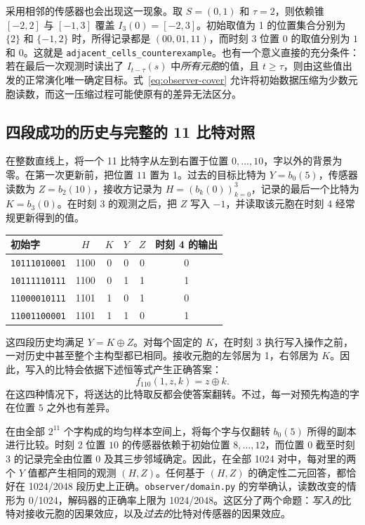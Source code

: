 采用相邻的传感器也会出现这一现象。取 $S=(0,1)$ 和 $\tau=2$，则依赖锥 $[-2,2]$ 与 $[-1,3]$ 覆盖 $I_3(0)=[-2,3]$。初始取值为 1 的位置集合分别为 $\{2\}$ 和 $\{-1,2\}$ 时，所得记录都是 $(00,01,11)$，而时刻 $3$ 位置 $0$ 的取值分别为 $1$ 和 $0$。这就是 \texttt{adjacent\_cells\_counterexample}。也有一个意义直接的充分条件：若在最后一次观测时读出了 $I_{t-\tau}(s)$ 中\emph{所有元胞}的值，且 $t\ge\tau$，则由这些值出发的正常演化唯一确定目标。式~\eqref{eq:observer-cover} 允许将初始数据压缩为少数元胞读数，而这一压缩过程可能使原有的差异无法区分。

\subsection{四段成功的历史与完整的 11 比特对照}

在整数直线上，将一个 11 比特字从左到右置于位置 $0,\ldots,10$，字以外的背景为零。在第一次更新前，把位置 $11$ 置为 1。过去的目标比特为 $Y=b_0(5)$，传感器读数为 $Z=b_2(10)$，接收方记录为 $H=(b_k(0))_{k=0}^3$，记录的最后一个比特为 $K=b_3(0)$。在时刻 3 的观测之后，把 $Z$ 写入 $-1$，并读取该元胞在时刻 4 经常规更新得到的值。

\begin{center}
\begin{tabular}{lccccc}
初始字 & $H$ & $K$ & $Y$ & $Z$ & 时刻 4 的输出 \\
\hline
\texttt{10111010001} & 1100 & 0 & 0 & 0 & 0 \\
\texttt{10111110111} & 1100 & 0 & 1 & 1 & 1 \\
\texttt{11000010111} & 1101 & 1 & 0 & 1 & 0 \\
\texttt{11001100001} & 1101 & 1 & 1 & 0 & 1
\end{tabular}
\end{center}

这四段历史均满足 $Y=K\oplus Z$。对每个固定的 $K$，在时刻 3 执行写入操作之前，一对历史中甚至整个主构型都已相同。接收元胞的左邻居为 1，右邻居为 $K$。因此，写入的比特会依据下述恒等式产生正确答案：
\begin{equation}
 f_{110}(1,z,k)=z\oplus k.
 \label{eq:observer-xor-gate}
\end{equation}
在这四种情况下，将送达的比特取反都会使答案翻转。不过，每一对预先构造的字在位置 $5$ 之外也有差异。

在由全部 $2^{11}$ 个字构成的均匀样本空间上，将每个字与仅翻转 $b_0(5)$ 所得的副本进行比较。时刻 2 位置 $10$ 的传感器依赖于初始位置 $8,\ldots,12$，而位置 $0$ 截至时刻 3 的记录完全由位置 $0$ 及其三步邻域确定。因此，在全部 1024 对中，每对里的两个 $Y$ 值都产生相同的观测 $(H,Z)$。任何基于 $(H,Z)$ 的确定性二元回答，都恰好在 1024/2048 段历史上正确。\nolinkurl{observer/domain.py} 的穷举确认，读数改变的情形为 0/1024，解码器的正确率上限为 1024/2048。这区分了两个命题：\emph{写入的}比特对接收元胞的因果效应，以及\emph{过去的}比特对传感器的因果效应。

